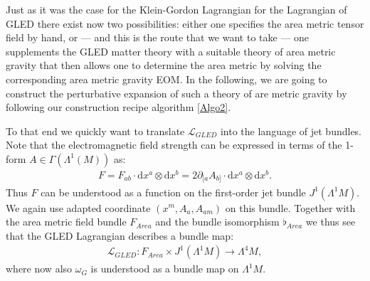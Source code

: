 Just as it was the case for the Klein-Gordon Lagrangian for the Lagrangian of GLED there exist now two possibilities: either one specifies the area metric tensor field by hand, or --- and this is the route that we want to take --- one supplements the GLED matter theory with a suitable theory of area metric gravity that then allows one to determine the area metric by solving the corresponding area metric gravity EOM. 
In the following, we are going to construct the perturbative expansion of such a theory of are metric gravity by following our construction recipe algorithm \ref{Algo2}.

To that end we quickly want to translate $\mathcal{L}_{GLED}$ into the language of jet bundles. Note that the electromagnetic field strength can be expressed in terms of the 1-form $A \in \Gamma(\Lambda^1(M))$ as:
\begin{align}
F = F_{ab} \cdot  \mathrm{d}x^a \otimes \mathrm{d}x^b = 2 \partial_{[a} A_{b]} \cdot \mathrm{d}x^a \otimes \mathrm{d}x^b.
\end{align}
Thus $F$ can be understood as a function on the first-order jet bundle $J^1(\Lambda^1M)$. We again use adapted coordinate $(x^m,A_a,A_{am})$ on this bundle. Together with the area metric field bundle $F_{Area}$ and the bundle isomorphism $\flat_{Area}$ we thus see that the GLED Lagrangian describes a bundle map:
\begin{align}
\mathcal{L}_{GLED} : F_{Area} \times J^1(\Lambda^1M) \rightarrow \Lambda^4M,
\end{align}
where now also $\omega_G$ is understood as a bundle map on $\Lambda^1M$.  

